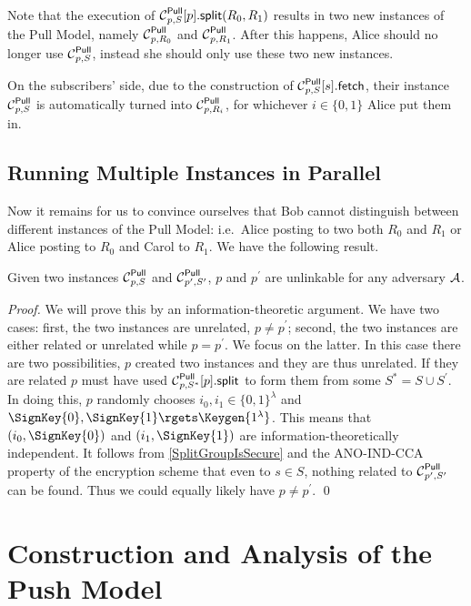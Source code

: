 Note that the execution of \(\psplit[p, S]{p}[R_0, R_1]\) results in two new 
instances of the Pull Model, namely \(\Pull[p, R_0]\) and \(\Pull[p, R_1]\).
After this happens, Alice should no longer use \(\Pull[p, S]\), instead she 
should only use these two new instances.

On the subscribers' side, due to the construction of \(\pget[p, S]{s}\), their 
instance \(\Pull[p, S]\) is automatically turned into \(\Pull[p, R_i]\), for 
whichever \(i\in \{0, 1\}\) Alice put them in.

\subsection{Running Multiple Instances in Parallel}
\label{ParallelPull}

Now it remains for us to convince ourselves that Bob cannot distinguish between
different instances of the Pull Model: i.e.\ Alice posting to two both \(R_0\) 
and \(R_1\) or Alice posting to \(R_0\) and Carol to \(R_1\).
We have the following result.

\begin{theorem}
  Given two instances \(\Pull[p, S]\) and \(\Pull[p^\prime, S^\prime]\), \(p\) 
  and \(p^\prime\) are unlinkable for any adversary \(\A\).
\end{theorem}

\begin{proof}
  We will prove this by an information-theoretic argument.
  We have two cases: first, the two instances are unrelated, \(p\neq 
    p^\prime\); second, the two instances are either related or unrelated while 
  \(p = p^\prime\).
  We focus on the latter.
  In this case there are two possibilities, \(p\) created two instances and 
  they are thus unrelated.
  If they are related \(p\) must have used \(\psplit[p, S^*]{p}\) to form them 
  from some \(S^* = S\cup S^\prime\).
  In doing this, \(p\) randomly chooses \(i_0, i_1\in \{0, 1\}^\lambda\) and 
  \(\SignKey{0}, \SignKey{1}\rgets \Keygen{1^\lambda}\).
  This means that \((i_0, \SignKey{0})\) and \((i_1, \SignKey{1})\) are 
  information-theoretically independent.
  It follows from \cref{SplitGroupIsSecure} and the ANO-IND-CCA property of the 
  encryption scheme that even to \(s\in S\), nothing related to 
  \(\Pull[p^\prime, S^\prime]\) can be found.
  Thus we could equally likely have \(p\neq p^\prime\).
  \qed{}
\end{proof}



\section{Construction and Analysis of the Push Model}
\label{PushAnalysis}

